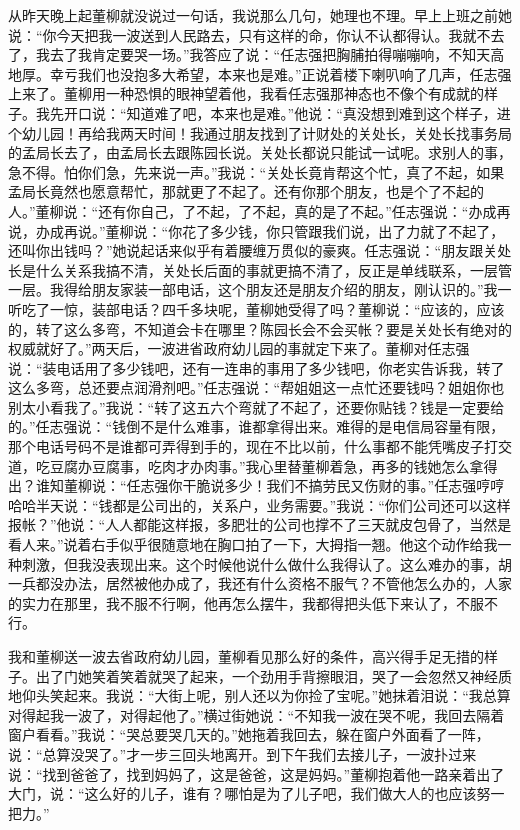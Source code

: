 \documentclass[12pt,oneside]{book}
\begin{document}
从昨天晚上起董柳就没说过一句话，我说那么几句，她理也不理。早上上班之前她说：``你今天把我一波送到人民路去，只有这样的命，你认不认都得认。我就不去了，我去了我肯定要哭一场。''我答应了说：``任志强把胸脯拍得嘣嘣响，不知天高地厚。幸亏我们也没抱多大希望，本来也是难。''正说着楼下喇叭响了几声，任志强上来了。董柳用一种恐惧的眼神望着他，我看任志强那神态也不像个有成就的样子。我先开口说：``知道难了吧，本来也是难。''他说：``真没想到难到这个样子，进个幼儿园！再给我两天时间！我通过朋友找到了计财处的关处长，关处长找事务局的孟局长去了，由孟局长去跟陈园长说。关处长都说只能试一试呢。求别人的事，急不得。怕你们急，先来说一声。''我说：``关处长竟肯帮这个忙，真了不起，如果孟局长竟然也愿意帮忙，那就更了不起了。还有你那个朋友，也是个了不起的人。''董柳说：``还有你自己，了不起，了不起，真的是了不起。''任志强说：``办成再说，办成再说。''董柳说：``你花了多少钱，你只管跟我们说，出了力就了不起了，还叫你出钱吗？''她说起话来似乎有着腰缠万贯似的豪爽。任志强说：``朋友跟关处长是什么关系我搞不清，关处长后面的事就更搞不清了，反正是单线联系，一层管一层。我得给朋友家装一部电话，这个朋友还是朋友介绍的朋友，刚认识的。''我一听吃了一惊，装部电话？四千多块呢，董柳她受得了吗？董柳说：``应该的，应该的，转了这么多弯，不知道会卡在哪里？陈园长会不会买帐？要是关处长有绝对的权威就好了。''两天后，一波进省政府幼儿园的事就定下来了。董柳对任志强说：``装电话用了多少钱吧，还有一连串的事用了多少钱吧，你老实告诉我，转了这么多弯，总还要点润滑剂吧。''任志强说：``帮姐姐这一点忙还要钱吗？姐姐你也别太小看我了。''我说：``转了这五六个弯就了不起了，还要你贴钱？钱是一定要给的。''任志强说：``钱倒不是什么难事，谁都拿得出来。难得的是电信局容量有限，那个电话号码不是谁都可弄得到手的，现在不比以前，什么事都不能凭嘴皮子打交道，吃豆腐办豆腐事，吃肉才办肉事。''我心里替董柳着急，再多的钱她怎么拿得出？谁知董柳说：``任志强你干脆说多少！我们不搞劳民又伤财的事。''任志强哼哼哈哈半天说：``钱都是公司出的，关系户，业务需要。''我说：``你们公司还可以这样报帐？''他说：``人人都能这样报，多肥壮的公司也撑不了三天就皮包骨了，当然是看人来。''说着右手似乎很随意地在胸口拍了一下，大拇指一翘。他这个动作给我一种刺激，但我没表现出来。这个时候他说什么做什么我得认了。这么难办的事，胡一兵都没办法，居然被他办成了，我还有什么资格不服气？不管他怎么办的，人家的实力在那里，我不服不行啊，他再怎么摆牛，我都得把头低下来认了，不服不行。

我和董柳送一波去省政府幼儿园，董柳看见那么好的条件，高兴得手足无措的样子。出了门她笑着笑着就哭了起来，一个劲用手背擦眼泪，哭了一会忽然又神经质地仰头笑起来。我说：``大街上呢，别人还以为你捡了宝呢。''她抹着泪说：``我总算对得起我一波了，对得起他了。''横过街她说：``不知我一波在哭不呢，我回去隔着窗户看看。''我说：``哭总要哭几天的。''她拖着我回去，躲在窗户外面看了一阵，说：``总算没哭了。''才一步三回头地离开。到下午我们去接儿子，一波扑过来说：``找到爸爸了，找到妈妈了，这是爸爸，这是妈妈。''董柳抱着他一路亲着出了大门，说：``这么好的儿子，谁有？哪怕是为了儿子吧，我们做大人的也应该努一把力。''
\end{document}

